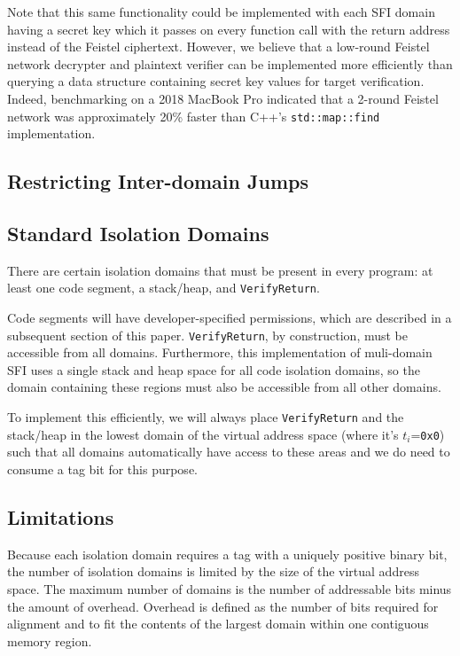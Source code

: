 \documentclass[12pt]{article}
\begin{document}
Note that this same functionality could be implemented with each SFI domain having a secret key which it passes on every function call with the return address instead of the Feistel ciphertext. However, we believe that a low-round Feistel network decrypter and plaintext verifier can be implemented more efficiently than querying a data structure containing secret key values for target verification. Indeed, benchmarking on a 2018 MacBook Pro indicated that a 2-round Feistel network was approximately 20\% faster than C++'s \texttt{std::map::find} implementation.

\subsection{Restricting Inter-domain Jumps}

\subsection{Standard Isolation Domains}

There are certain isolation domains that must be present in every program: at least one code segment, a stack/heap, and \texttt{VerifyReturn}.

Code segments will have developer-specified permissions, which are described in a subsequent section of this paper. \texttt{VerifyReturn}, by construction, must be accessible from all domains. Furthermore, this implementation of muli-domain SFI uses a single stack and heap space for all code isolation domains, so the domain containing these regions must also be accessible from all other domains.

To implement this efficiently, we will always place \texttt{VerifyReturn} and the stack/heap in the lowest domain of the virtual address space (where it's $t_i$=\texttt{0x0}) such that all domains automatically have access to these areas and we do need to consume a tag bit for this purpose. 

\subsection{Limitations}

Because each isolation domain requires a tag with a uniquely positive binary bit, the number of isolation domains is limited by the size of the virtual address space. The maximum number of domains is the number of addressable bits minus the amount of overhead. Overhead is defined as the number of bits required for alignment and to fit the contents of the largest domain within one contiguous memory region.
\end{document}
